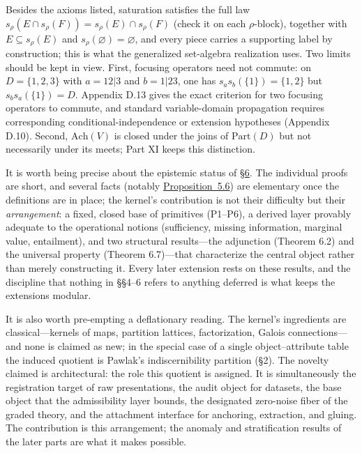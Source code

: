 \begin{thmrem}

Besides the axioms listed, saturation satisfies the full law \(s_\rho(E\cap s_\rho(F))=s_\rho(E)\cap s_\rho(F)\) (check it on each \(\rho\)-block), together with \(E\subseteq s_\rho(E)\) and \(s_\rho(\varnothing)=\varnothing\), and every piece carries a supporting label by construction; this is what the generalized set-algebra realization uses. Two limits should be kept in view. First, focusing operators need not commute: on \(D=\{1,2,3\}\) with \(a=12|3\) and \(b=1|23\), one has \(s_a s_b(\{1\})=\{1,2\}\) but \(s_b s_a(\{1\})=D\). Appendix D.13 gives the exact criterion for two focusing operators to commute, and standard variable-domain propagation requires corresponding conditional-independence or extension hypotheses (Appendix D.10). Second, \(\mathrm{Ach}(V)\) is closed under the joins of \(\mathrm{Part}(D)\) but not necessarily under its meets; Part XI keeps this distinction.
\end{thmrem}


It is worth being precise about the epistemic status of \hyperlink{sec:6}{§6}. The individual proofs are short, and several facts (notably \hyperlink{stmt:5.6}{Proposition~5.6}) are elementary once the definitions are in place; the kernel's contribution is not their difficulty but their \emph{arrangement}: a fixed, closed base of primitives (P1--P6), a derived layer provably adequate to the operational notions (sufficiency, missing information, marginal value, entailment), and two structural results---\hspace{0pt}the adjunction (Theorem 6.2) and the universal property (Theorem 6.7)---\hspace{0pt}that characterize the central object rather than merely constructing it. Every later extension rests on these results, and the discipline that nothing in §§4--6 refers to anything deferred is what keeps the extensions modular.

It is also worth pre-empting a deflationary reading. The kernel's ingredients are classical---\hspace{0pt}kernels of maps, partition lattices, factorization, Galois connections---\hspace{0pt}and none is claimed as new; in the special case of a single object--attribute table the induced quotient is Pawlak's indiscernibility partition (§2). The novelty claimed is architectural: the role this quotient is assigned. It is simultaneously the registration target of raw presentations, the audit object for datasets, the base object that the admissibility layer bounds, the designated zero-noise fiber of the graded theory, and the attachment interface for anchoring, extraction, and gluing. The contribution is this arrangement; the anomaly and stratification results of the later parts are what it makes possible.

